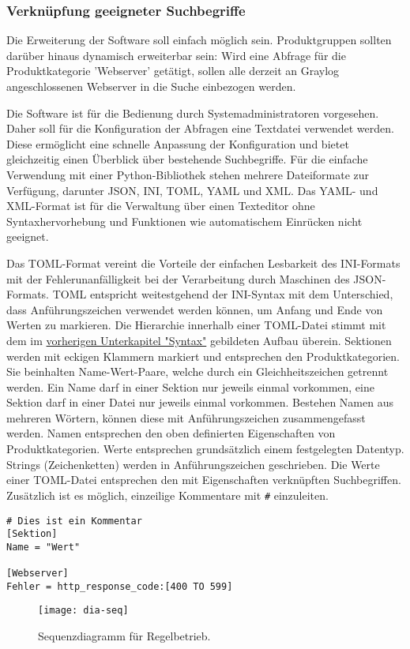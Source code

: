 \subsubsection{Verknüpfung geeigneter Suchbegriffe}

Die Erweiterung der Software soll einfach möglich sein. Produktgruppen sollten darüber hinaus dynamisch erweiterbar sein: Wird eine Abfrage für die Produktkategorie 'Webserver' getätigt, sollen alle derzeit an Graylog angeschlossenen Webserver in die Suche einbezogen werden. 

Die Software ist für die Bedienung durch Systemadministratoren vorgesehen. Daher soll für die Konfiguration der Abfragen eine Textdatei verwendet werden. Diese ermöglicht eine schnelle Anpassung der Konfiguration und bietet gleichzeitig einen Überblick über bestehende Suchbegriffe. Für die einfache Verwendung mit einer Python-Bibliothek stehen mehrere Dateiformate zur Verfügung, darunter JSON, INI, TOML, YAML und XML. Das YAML- und XML-Format ist für die Verwaltung über einen Texteditor ohne Syntaxhervorhebung und Funktionen wie automatischem Einrücken nicht geeignet. 

Das TOML-Format vereint die Vorteile der einfachen Lesbarkeit des INI-Formats mit der Fehlerunanfälligkeit bei der Verarbeitung durch Maschinen des JSON-Formats. TOML entspricht weitestgehend der INI-Syntax mit dem Unterschied, dass Anführungszeichen verwendet werden können, um Anfang und Ende von Werten zu markieren. Die Hierarchie innerhalb einer TOML-Datei stimmt mit dem im \hyperref[sec:syntax]{vorherigen Unterkapitel "Syntax"} gebildeten Aufbau überein. Sektionen werden mit eckigen Klammern markiert und entsprechen den Produktkategorien. Sie beinhalten Name-Wert-Paare, welche durch ein Gleichheitszeichen getrennt werden. Ein Name darf in einer Sektion nur jeweils einmal vorkommen, eine Sektion darf in einer Datei nur jeweils einmal vorkommen. Bestehen Namen aus mehreren Wörtern, können diese mit Anführungszeichen zusammengefasst werden. Namen entsprechen den oben definierten Eigenschaften von Produktkategorien. Werte entsprechen grundsätzlich einem festgelegten Datentyp. Strings (Zeichenketten) werden in Anführungszeichen geschrieben. Die Werte einer TOML-Datei entsprechen den mit Eigenschaften verknüpften Suchbegriffen. Zusätzlich ist es möglich, einzeilige Kommentare mit \lstinline{#} einzuleiten.

\begin{lstlisting}[caption={Beispiel der TOML-Syntax.}, label=toml-syntax, xleftmargin=6mm]
# Dies ist ein Kommentar
[Sektion]
Name = "Wert"

[Webserver]
Fehler = http_response_code:[400 TO 599] 
\end{lstlisting}

\begin{figure}[h!]
\centering
\texttt{[image: dia-seq]}
\caption{Sequenzdiagramm für Regelbetrieb.}
\label{fig:dia-seq}
\end{figure}
